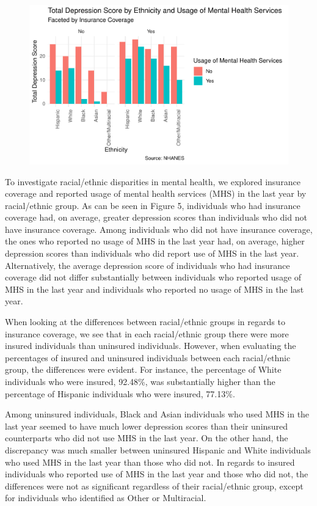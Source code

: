 \documentclass[man]{apa6}
\begin{document}
\begin{figure}
\centering
\includegraphics{Final_Paper_Group_3_files/figure-latex/AG_fig5-1.pdf}
\caption{}
\end{figure}

To investigate racial/ethnic disparities in mental health, we explored
insurance coverage and reported usage of mental health services (MHS) in
the last year by racial/ethnic group. As can be seen in Figure 5,
individuals who had insurance coverage had, on average, greater
depression scores than individuals who did not have insurance coverage.
Among individuals who did not have insurance coverage, the ones who
reported no usage of MHS in the last year had, on average, higher
depression scores than individuals who did report use of MHS in the last
year. Alternatively, the average depression score of individuals who had
insurance coverage did not differ substantially between individuals who
reported usage of MHS in the last year and individuals who reported no
usage of MHS in the last year.

When looking at the differences between racial/ethnic groups in regards
to insurance coverage, we see that in each racial/ethnic group there
were more insured individuals than uninsured individuals. However, when
evaluating the percentages of insured and uninsured individuals between
each racial/ethnic group, the differences were evident. For instance,
the percentage of White individuals who were insured, 92.48\%, was
substantially higher than the percentage of Hispanic individuals who
were insured, 77.13\%.

Among uninsured individuals, Black and Asian individuals who used MHS in
the last year seemed to have much lower depression scores than their
uninsured counterparts who did not use MHS in the last year. On the
other hand, the discrepancy was much smaller between uninsured Hispanic
and White individuals who used MHS in the last year than those who did
not. In regards to insured individuals who reported use of MHS in the
last year and those who did not, the differences were not as significant
regardless of their racial/ethnic group, except for individuals who
identified as Other or Multiracial.
\end{document}
